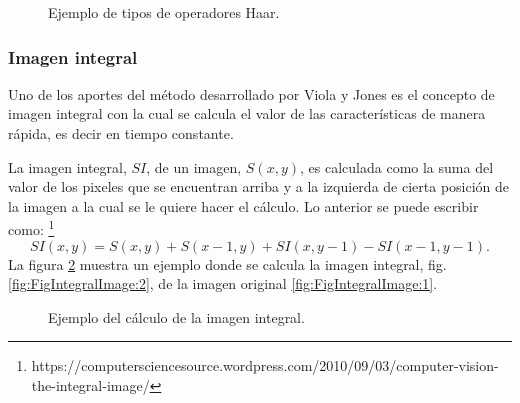\begin{figure}[h!]
\caption{Ejemplo de tipos de operadores Haar.} \label{fig:haarFeatures}
\end{figure}


\subsubsection{Imagen integral}\label{sssec:IntegralImage} 

Uno de los aportes del método desarrollado por Viola y Jones es el concepto de imagen integral con la cual se calcula el valor de las características de manera rápida, es decir en tiempo constante. 

La imagen integral, $SI$, de un imagen, $S(x,y)$, es calculada como la suma del valor de los pixeles que se encuentran arriba y a la izquierda de cierta posición de la imagen a la cual se le quiere hacer el cálculo. Lo anterior se puede escribir como: \footnote{https://computersciencesource.wordpress.com/2010/09/03/computer-vision-the-integral-image/}     
$$SI(x,y)=S(x,y) + S(x-1,y) + SI(x,y-1)-SI(x-1,y-1).$$ 
La figura \ref{fig:FigIntegralImage} muestra un  ejemplo donde se calcula la imagen integral, fig. \ref{fig:FigIntegralImage:2}, de la imagen original \ref{fig:FigIntegralImage:1}.
\begin{figure}[h!]
\centering
{} \qquad
{}
\caption{Ejemplo del cálculo de la imagen integral.} 
\label{fig:FigIntegralImage}
\end{figure}

